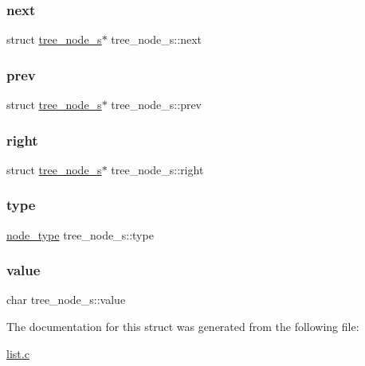 \mbox{\label{structtree__node__s_a11868a6a9d5175dadb40fd7a7a40245a}} 
\subsubsection{\texorpdfstring{next}{next}}
{\footnotesize\ttfamily struct \mbox{\hyperlink{structtree__node__s}{tree\+\_\+node\+\_\+s}}$\ast$ tree\+\_\+node\+\_\+s\+::next}

\mbox{\label{structtree__node__s_abaa4a0dec19de2b05bbc50d7804f5155}} 
\subsubsection{\texorpdfstring{prev}{prev}}
{\footnotesize\ttfamily struct \mbox{\hyperlink{structtree__node__s}{tree\+\_\+node\+\_\+s}}$\ast$ tree\+\_\+node\+\_\+s\+::prev}

\mbox{\label{structtree__node__s_abed0324b1cb4a573e75d7bc58c555332}} 
\subsubsection{\texorpdfstring{right}{right}}
{\footnotesize\ttfamily struct \mbox{\hyperlink{structtree__node__s}{tree\+\_\+node\+\_\+s}}$\ast$ tree\+\_\+node\+\_\+s\+::right}

\mbox{\label{structtree__node__s_a090b69b8f438d25df237e4b217eac3e5}} 
\subsubsection{\texorpdfstring{type}{type}}
{\footnotesize\ttfamily \mbox{\hyperlink{list_8h_a6a276b85e2da28c5f9c3dbce61c55682}{node\+\_\+type}} tree\+\_\+node\+\_\+s\+::type}

\mbox{\label{structtree__node__s_a3f82a6355d2a50f51dcafd8217aa8e20}} 
\subsubsection{\texorpdfstring{value}{value}}
{\footnotesize\ttfamily char tree\+\_\+node\+\_\+s\+::value}



The documentation for this struct was generated from the following file\+:\begin{DoxyCompactItemize}
\item 
\mbox{\hyperlink{list_8c}{list.\+c}}\end{DoxyCompactItemize}
